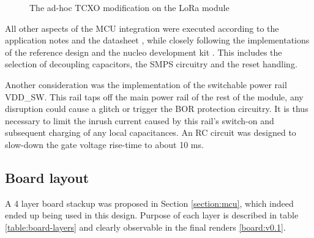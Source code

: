\begin{figure}
    \centering
     \hfil
    \caption{\label{fig:tcxo-bodge}The ad-hoc TCXO modification on the LoRa module}
\end{figure}

All other aspects of the MCU integration were executed according to the application notes and the datasheet  \cite{stmicroelectronics_stm32wle5xx_nodate,stmicroelectronics_how_nodate-1}, while closely following the implementations of the reference design and the nucleo development kit \cite{stmicroelectronics_stdes-wl5u4ilh_2024,stmicroelectronics_nucleo-wl55jc_2024}. This includes the selection of decoupling capacitors, the SMPS circuitry and the reset handling.

Another consideration was the implementation of the switchable power rail VDD\_SW. This rail taps off the main power rail of the rest of the module, any disruption could cause a glitch or trigger the BOR protection circuitry. It is thus necessary to limit the inrush current caused by this rail's switch-on and subsequent charging of any local capacitances. An RC circuit was designed to slow-down the gate voltage rise-time to about 10 ms.

\subsection{Board layout}
A 4 layer board stackup was proposed in Section \ref{section:mcu}, which indeed ended up being used in this design. Purpose of each layer is described in table \ref{table:board-layers} and clearly observable in the final renders \ref{board:v0.1}.


